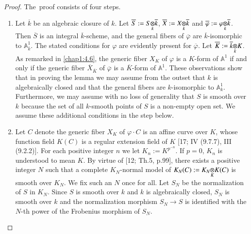 \begin{proof}
The\pageoriginale\ proof consists of four steps.
\begin{enumerate}
\renewcommand{\theenumi}{\Roman{enumi}}
\renewcommand{\labelenumi}{(\theenumi)}
\item Let $\overline{k}$ be an algebraic closure of $k$. Let
  $\overline{S}:=\foprod{S}{\overline{k}}{k}$,
  $\overline{X}:=\foprod{X}{\overline{k}}{k}$ and
  $\overline{\varphi}:=\foprod{\varphi}{\overline{k}}{k}$. Then
  $\overline{S}$ is an integral $\overline{k}$-scheme, and the general
  fibers of $\overline{\varphi}$ are $\overline{k}$-isomorphic to
  $\mathbb{A}^{1}_{\overline{k}}$. The stated conditions for $\varphi$
  are evidently present for $\overline{\varphi}$. Let
  $\overline{K}:=\foprod{\overline{k}}{K}{k}$. As remarked in
  \ref{chap1:4.6}, the generic fiber $X_{K}$ of $\varphi$ is a $K$-form of
  $\mathbb{A}^{1}$ if and only if the generic fiber
  $\overline{X}_{\overline{K}}$ of $\overline{\varphi}$ is a
  $\overline{K}$-form of $\mathbb{A}^{1}$. These observations show
  that in proving the lemma we may assume from the outset that $k$ is
  algebraically closed and that the general fibers are $k$-isomorphic
  to $\mathbb{A}^{1}_{k}$. Furthermore, we may assume with no loss of
  generality that $S$ is smooth over $k$ because the set of all
  $k$-smooth points of $S$ is a non-empty open set. We assume these
  additional conditions in the step below.

\item Let $C$ denote the generic fiber $X_{K}$ of $\varphi\cdot C$ is
  an affine curve over $K$, whose function field $K(C)$ is a regular
  extension field of $K$ [17; IV (9.7.7), III (9.2.2)]. For each
  positive integer $n$ we let $K_{n}:=K^{p^{-n}}$. If $p=0$, $K_{n}$
  is understood to mean $K$. By virtue of [12; Th.5, p.99], there
  exists a positive integer $N$ such that a complete $K_{N}$-normal
  model of $K_{N}(C):=\foprod{K_{N}}{K(C)}{K}$ is smooth over
  $K_{N}$. We fix such an $N$ once for all. Let $S_{N}$ be the
  normalization of $S$ in $K_{N}$. Since $S$ is smooth over $k$ and
  $k$ is algebraically closed, $S_{N}$ is smooth over $k$ and the
  normalization morphism $S_{N}\to S$ is identified with the $N$-th
  power of the Frobenius morphism of $S_{N}$.


\end{enumerate}
\end{proof}
